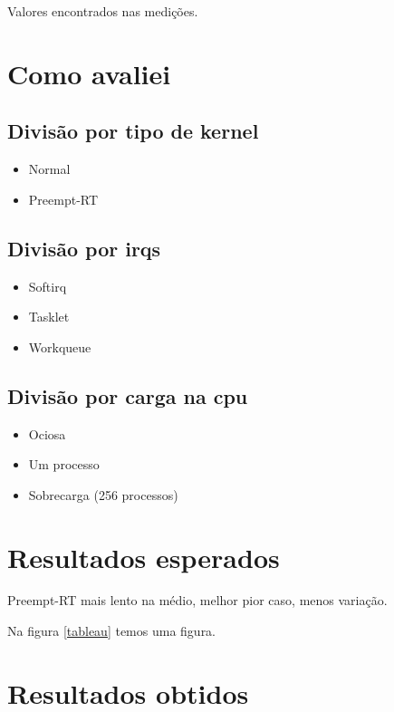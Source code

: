 
Valores encontrados nas medições.

\section{Como avaliei}

\subsection{Divisão por tipo de kernel}

\begin{itemize}
\item Normal
\item Preempt-RT
\end{itemize}

\subsection{Divisão por irqs}

\begin{itemize}
\item Softirq
\item Tasklet
\item Workqueue
\end{itemize}

\subsection{Divisão por carga na cpu}

\begin{itemize}
\item Ociosa
\item Um processo
\item Sobrecarga (256 processos)
\end{itemize}

\section{Resultados esperados}

Preempt-RT mais lento na médio, melhor pior caso, menos variação.

Na figura \ref{tableau} temos uma figura.

\section{Resultados obtidos}

